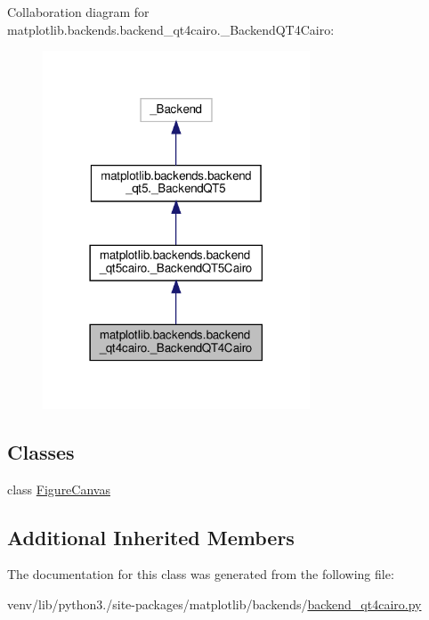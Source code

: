 Collaboration diagram for matplotlib.\+backends.\+backend\+\_\+qt4cairo.\+\_\+\+Backend\+Q\+T4\+Cairo\+:
\nopagebreak
\begin{figure}[H]
\begin{center}
\leavevmode
\includegraphics[width=225pt]{classmatplotlib_1_1backends_1_1backend__qt4cairo_1_1__BackendQT4Cairo__coll__graph}
\end{center}
\end{figure}
\subsection*{Classes}
\begin{DoxyCompactItemize}
\item 
class \hyperlink{classmatplotlib_1_1backends_1_1backend__qt4cairo_1_1__BackendQT4Cairo_1_1FigureCanvas}{Figure\+Canvas}
\end{DoxyCompactItemize}
\subsection*{Additional Inherited Members}


The documentation for this class was generated from the following file\+:\begin{DoxyCompactItemize}
\item 
venv/lib/python3./site-\/packages/matplotlib/backends/\hyperlink{backend__qt4cairo_8py}{backend\+\_\+qt4cairo.\+py}\end{DoxyCompactItemize}
